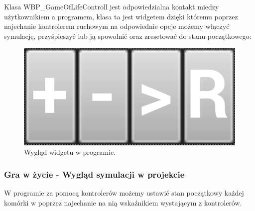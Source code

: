 \documentclass[a4paper,12pt,reqno]{article}
\begin{document}
Klasa WBP\_GameOfLifeControll jest odpowiedzialna kontakt miedzy użytkownikiem a programem, klasa ta jest widgetem dzięki któremu poprzez najechanie kontrolerem ruchowym na odpowiednie opcje możemy włączyć symulację, przyśpieszyć lub ją spowolnić oraz zresetować do stanu początkowego:

\begin{figure}[!ht]%
\centering
\includegraphics[width=0.7\columnwidth]{graphics/gameoflife/GameOfLifeControllInUE_1.png}
\caption{Wygląd widgetu w programie.
\label{BPExample}}%
%
\qquad
\end{figure}  

\subsubsection{Gra w życie - Wygląd symulacji w projekcie}
W programie za pomocą kontrolerów możemy ustawić stan początkowy każdej komórki w poprzez najechanie na nią wskaźnikiem wystającym z kontrolerów.
\end{document}
